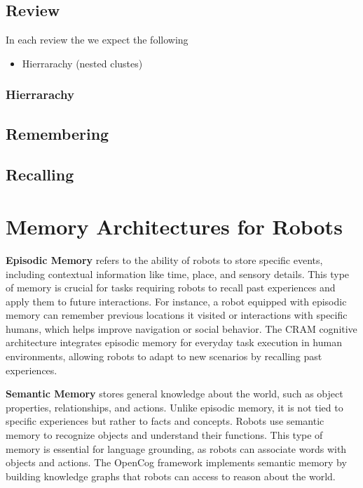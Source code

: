     \subsection{Review}
        In each review the we expect the following
        \begin{itemize}
            \item Hierrarachy (nested clustes)
        \end{itemize}
        \subsubsection{Hierrarachy}


    \subsection{Remembering}

    \subsection{Recalling}




\section{Memory Architectures for Robots}
    \textbf{Episodic Memory} refers to the ability of robots to store specific events, including contextual information like time, place, and sensory details. This type of memory is crucial for tasks requiring robots to recall past experiences and apply them to future interactions. For instance, a robot equipped with episodic memory can remember previous locations it visited or interactions with specific humans, which helps improve navigation or social behavior. The CRAM cognitive architecture integrates episodic memory for everyday task execution in human environments, allowing robots to adapt to new scenarios by recalling past experiences. 

    \textbf{Semantic Memory} stores general knowledge about the world, such as object properties, relationships, and actions. Unlike episodic memory, it is not tied to specific experiences but rather to facts and concepts. Robots use semantic memory to recognize objects and understand their functions. This type of memory is essential for language grounding, as robots can associate words with objects and actions. The OpenCog framework implements semantic memory by building knowledge graphs that robots can access to reason about the world. 


